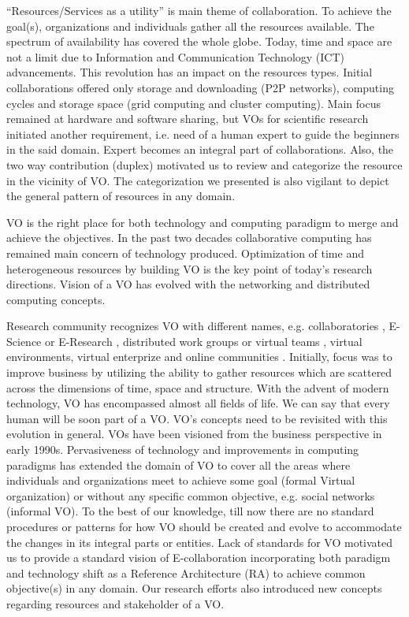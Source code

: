 \documentclass[]{article}
\begin{document}
``Resources/Services as a utility'' is main theme of collaboration. To achieve the goal(s), organizations and individuals gather all the resources available. The spectrum of availability has covered the whole globe. Today, time and space are not a limit due to Information and Communication Technology (ICT) advancements. This revolution has an impact on the resources types. Initial collaborations offered only storage and downloading (P2P networks), computing cycles and storage space (grid computing and cluster computing). Main focus remained at hardware and software sharing, but VOs for scientific research initiated another requirement, i.e. need of a human expert to guide the beginners in the said domain. Expert becomes an integral part of collaborations. Also, the two way contribution (duplex) motivated us to review and categorize the resource in the vicinity of VO. The categorization we presented is also vigilant to depict the general pattern of resources in any domain.

VO is the right place for both technology and computing paradigm to merge and achieve the objectives. In the past two decades collaborative computing has remained main concern of technology produced. Optimization of time and heterogeneous resources by building VO is the key point of today's research directions. Vision of a VO has evolved with the networking and distributed computing concepts.

Research community recognizes VO with different names, e.g. collaboratories \cite{Kesselman2008} \cite{WAWulf1993}, E-Science or E-Research \cite{Kesselman2008} \cite{Hey2005}, distributed work groups or virtual teams \cite{Kesselman2008} \cite{OLeary2007}, virtual environments, virtual enterprize \cite{Katzy2005} and online communities \cite{Kesselman2008} \cite{Preece2000}. Initially, focus was to improve business by utilizing the ability to gather resources which are scattered across the dimensions of time, space and structure. With the advent of modern technology, VO has encompassed almost all fields of life. We can say that every human will be soon part of a VO. VO's concepts need to be revisited with this evolution in general. VOs have been visioned from the business perspective in early 1990s. Pervasiveness of technology and improvements in computing paradigms has extended the domain of VO to cover all the areas where individuals and organizations meet to achieve some goal (formal Virtual organization) or without any specific common objective, e.g. social networks (informal VO). To the best of our knowledge, till now there are no standard procedures or patterns for how VO should be created and evolve to accommodate the changes in its integral parts or entities. Lack of standards for VO motivated us to provide a standard vision of E-collaboration incorporating both paradigm and technology shift as a Reference Architecture (RA) to achieve common objective(s) in any domain. Our research efforts also introduced new concepts regarding resources and stakeholder of a VO.
\end{document}
